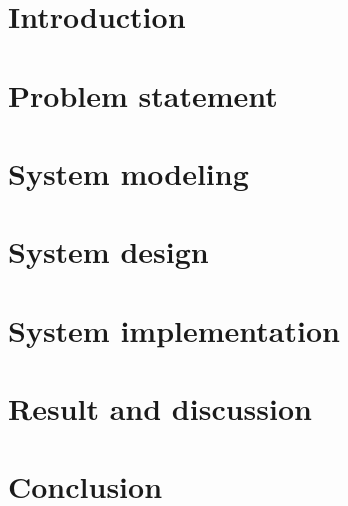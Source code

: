 \documentclass[11pt,a4paper,fleqn]{article}
\begin{document}

\newpage

\tableofcontents
\newpage


\section{Introduction}%
\label{sec:introduction}


\section{Problem statement}%
\label{sec:problem_statement}


\section{System modeling}%
\label{sec:system_modeling}


\section{System design}%
\label{sec:system_design}


\section{System implementation}%
\label{sec:system_implementation}


\section{Result and discussion}%
\label{sec:result_and_discussion}


\section{Conclusion}%
\label{sec:conclusion}


{}

\end{document}

